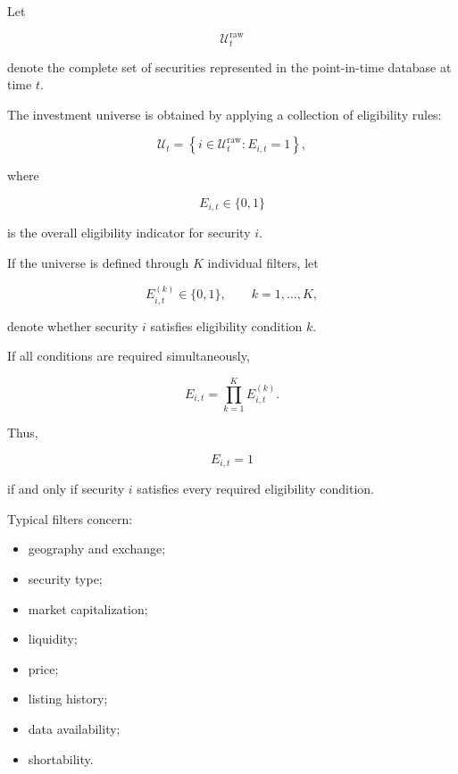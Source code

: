 \documentclass[11pt,a4paper]{article}
\begin{document}
Let

\begin{equation}
\mathcal{U}_t^{\mathrm{raw}}
\end{equation}

denote the complete set of securities represented in the point-in-time
database at time $t$.

The investment universe is obtained by applying a collection of eligibility
rules:

\begin{equation}
\boxed{
\mathcal{U}_t
=
\left\{
i\in\mathcal{U}_t^{\mathrm{raw}}
:
E_{i,t}=1
\right\},
}
\end{equation}

where

\begin{equation}
E_{i,t}
\in
\{0,1\}
\end{equation}

is the overall eligibility indicator for security $i$.

If the universe is defined through $K$ individual filters, let

\begin{equation}
E_{i,t}^{(k)}
\in
\{0,1\},
\qquad
k=1,\ldots,K,
\end{equation}

denote whether security $i$ satisfies eligibility condition $k$.

If all conditions are required simultaneously,

\begin{equation}
\boxed{
E_{i,t}
=
\prod_{k=1}^{K}
E_{i,t}^{(k)}.
}
\end{equation}

Thus,

\begin{equation}
E_{i,t}=1
\end{equation}

if and only if security $i$ satisfies every required eligibility condition.

Typical filters concern:

\begin{itemize}
    \item geography and exchange;
    \item security type;
    \item market capitalization;
    \item liquidity;
    \item price;
    \item listing history;
    \item data availability;
    \item shortability.
\end{itemize}
\end{document}

